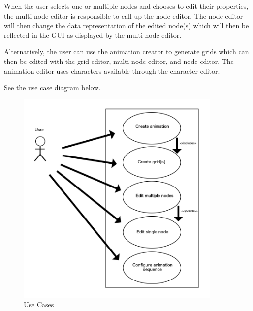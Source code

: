 \documentclass[12pt]{article}
\begin{document}
When the user selects one or multiple nodes and chooses to edit their properties, the multi-node editor is responsible to call up the node editor. The node editor will then change the data representation of the edited node(s) which will then be reflected in the GUI as displayed by the multi-node editor.

Alternatively, the user can use the animation creator to generate grids which can then be edited with the grid editor, multi-node editor, and node editor. The animation editor uses characters available through the character editor.

See the use case diagram below.

\begin{figure}[ht!]
\centering
\includegraphics[width=100mm]{Relationship_Use.png}
\caption{Use Cases}
\end{figure}
\clearpage
\end{document}
